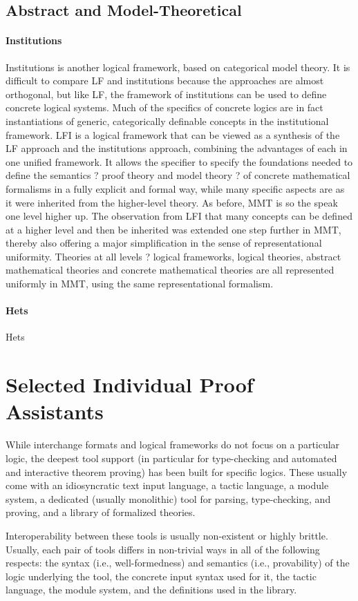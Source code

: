 \documentclass[12pt]{article}
\newcommand{\system}[2][]{\paragraph{#2}#2 \ifnonempty[\cite{#2}]{#1}{\cite{#1}}}
\begin{document}
\subsection{Abstract and Model-Theoretical}

\system{Institutions} is another logical framework, based on categorical model theory.  It is difficult to compare LF and institutions because the approaches are almost orthogonal, but like LF, the framework of institutions can be used to define concrete logical systems.  Much of the specifics of concrete logics are in fact instantiations of generic, categorically definable concepts in the institutional framework.
LFI is a logical framework that can be viewed as a synthesis of the LF approach and the institutions approach, combining the advantages of each in one unified framework. It allows the specifier to specify the foundations needed to define the semantics ? proof theory and model theory ? of concrete mathematical formalisms in a fully explicit and formal way, while many specific aspects are as it were inherited from the higher-level theory.
As before, MMT is so the speak one level higher up. The observation from LFI that many concepts can be defined at a higher level and then be inherited was extended one step further in MMT, thereby also offering a major simplification in the sense of representational uniformity. Theories at all levels ? logical frameworks, logical theories, abstract mathematical theories and concrete mathematical theories are all represented uniformly in MMT, using the same representational formalism.

\system{Hets}

\section{Selected Individual Proof Assistants}

While interchange formats and logical frameworks do not focus on a particular logic, the deepest tool support (in particular for type-checking and automated and interactive theorem proving) has been built for specific logics.
These usually come with an idiosyncratic text input language, a tactic language, a module system, a dedicated (usually monolithic) tool for parsing, type-checking, and proving, and a library of formalized theories.

Interoperability between these tools is usually non-existent or highly brittle.
Usually, each pair of tools differs in non-trivial ways in all of the following respects: the syntax (i.e., well-formedness) and semantics (i.e., provability) of the logic underlying the tool, the concrete input syntax used for it, the tactic language, the module system, and the definitions used in the library.
\end{document}
